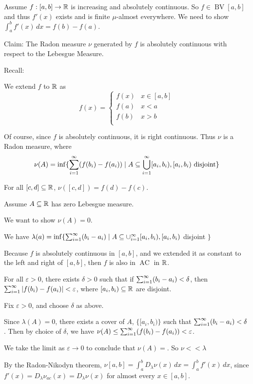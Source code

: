 \documentclass[x11names,reqno,14pt]{extarticle}
\newcommand{\seq}[2][\oo]{_{#2 = 1}^#1}
\DeclareMathOperator{\BV}{BV}
\DeclareMathOperator{\AC}{AC}
\begin{document}
\proof

Assume $f:[a,b]\to\mathbb{R}$ is increasing and absolutely continuous. So $f \in \BV[a,b]$ and thus $f'(x)$ exists and is finite $\mu$-almost everywhere. We need to show $\int_a^bf'(x)\,dx = f(b) - f(a)$.

Claim: The Radon measure $\nu$ generated by $f$ is absolutely continuous with respect to the Lebesgue Measure.

Recall:

We extend $f$ to $\mathbb{R}$ as
\[
f(x) = \begin{cases} f(x) & x\in[a,b] \\ f(a) & x < a \\ f(b) & x > b \\ \end{cases}
\]

Of course, since $f$ is absolutely continuous, it is right continuous. Thus $\nu$ is a Radon measure, where
\[
\nu(A) = \inf\{\sum\seq{i}(f(b_i) - f(a_i)) \mid A \subseteq \bigcup\seq{i}[a_i,b_i), [a_i, b_i)\text{ disjoint}\}
\]


For all $[c, d]\subseteq\mathbb{R}$, $\nu([c, d]) = f(d) - f(c)$.

Assume $A \subseteq \mathbb{R}$ has zero Lebesgue measure. 

We want to show $\nu(A) = 0$. 

We have $\lambda(a)= \inf\{\sum\seq{i}(b_i - a_i) \mid A\subseteq \cup\seq{i}[a_i, b_i), [a_i, b_i)$ disjoint $\}$

Because $f$ is absolutely continuous in $[a, b]$, and we extended it as constant to the left and right of $[a,b]$, then $f$ is also in $\AC$ in $\mathbb{R}$. 

For all $\varepsilon>0$, there exists $\delta>0$ such that if $\sum\seq{i}(b_i - a_i)<\delta$, then $\sum\seq{i}|f(b_i) - f(a_i)| < \varepsilon$, where $[a_i, b_i)\subseteq\mathbb{R}$ are disjoint. 

Fix $\varepsilon>0$, and choose $\delta$ as above. 

Since $\lambda(A) = 0$, there exists a cover of $A$, $\{[a_i, b_i)\}$ such that $\sum\seq{i}(b_i - a_i)<\delta$. Then by choice of $\delta$, we have $\nu(A)\leq\sum\seq{i}(f(b_i) - f(a_i)) < \varepsilon$.

We take the limit as $\varepsilon\to0$ to conclude that $\nu(A) = $. So $\nu<<\lambda$

By the Radon-Nikodyn theorem, $\nu[a, b] = \int_a^bD_{\lambda}\nu(x)\,dx = \int_a^bf'(x)\,dx$, since $f'(x) = D_{\lambda}\nu_{ac}(x) = D_{\lambda}\nu(x)$ for almost every $x \in [a, b]$. 
\end{document}
